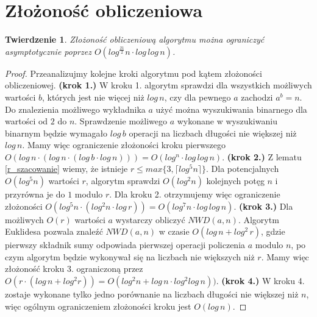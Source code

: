 \documentclass[declaration,shortabstract]{iithesis}
\theoremstyle{definition}
\theoremstyle{remark} \newtheorem{observation}{Obserwacja}
\theoremstyle{plain} \newtheorem{theorem}{Twierdzenie}
\theoremstyle{plain} \newtheorem{lemma}{Lemat}
\theoremstyle{remark} \newtheorem*{remark*}{Uwaga}
\theoremstyle{reminder} \newtheorem*{reminder*}{Przypomnienie}
\begin{document}
	

	

	

	

	
\section{Złożoność obliczeniowa}
	
\begin{theorem}
	Złożoność obliczeniową algorytmu można ograniczyć asymptotycznie poprzez $O(log^{\frac{21}{2}}n \cdot log \, log \, n)$.
\end{theorem}
	
\begin{proof}
	Przeanalizujmy kolejne kroki algorytmu pod kątem złożoności obliczeniowej. \newline
	\textbf{(krok 1.)} W kroku 1. algorytm sprawdzi dla wszystkich możliwych wartości $b$, których jest nie więcej niż $log\,n$, czy dla pewnego $a$ zachodzi $a^b = n$. Do znalezienia możliwego wykładnika $a$ użyć można wyszukiwania binarnego dla wartości od $2$ do $n$. Sprawdzenie możliwego $a$ wykonane w wyszukiwaniu binarnym będzie wymagało $log \, b$ operacji na liczbach długości nie większej niż $log \, n$. Mamy więc ograniczenie złożoności kroku pierwszego $O(log \, n \cdot (log \,n \cdot (log \,b \cdot log \,n ))) = O(log^n \cdot log \, log \, n)$.\newline
	\textbf{(krok 2.)} Z lematu \ref{r_szacowanie} wiemy, że istnieje $r \leq max\{3, \lceil log^5n \rceil \}$. Dla potencjalnych $O(log^5n)$ wartości $r$, algorytm sprawdzi $O(log^2n)$ kolejnych potęg $n$ i przyrówna je do $1$ modulo $r$. Dla kroku 2. otrzymujemy więc ograniczenie złożoności $O(log^5n \cdot (log^2n \cdot log \,r)) = O(log^7n \cdot log\,log \,n)$. \newline
	\textbf{(krok 3.)} Dla możliwych $O(r)$ wartości $a$ wystarczy obliczyć $NWD(a, n)$. Algorytm Euklidesa pozwala znaleźć $NWD(a, n)$ w czasie $O(log \,n + log ^2 \, r)$, gdzie pierwszy składnik sumy odpowiada pierwszej operacji policzenia $a$ modulo $n$, po czym algorytm będzie wykonywał się na liczbach nie większych niż $r$. Mamy więc złożoność kroku 3. ograniczoną przez $O(r \cdot (log \, n + log^2r)) = O(log^2n + log\,n \cdot log^2log \, n))$. \newline
	\textbf{(krok 4.)} W kroku 4. zostaje wykonane tylko jedno porównanie na liczbach długości nie większej niż $n$, więc ogólnym ograniczeniem złożoności kroku jest $O(log\,n)$.\newline

\end{proof}
\end{document}
